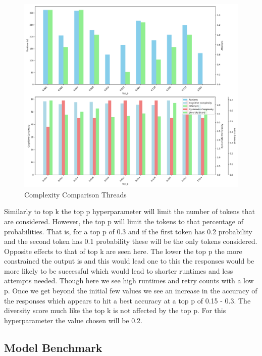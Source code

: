 \documentclass[12pt]{extarticle}
\begin{document}
\begin{figure}[h!]
\centering
\includegraphics[width=0.8\linewidth]{Images/Hyperparam_top_p_Comparison.png}
\caption{Complexity Comparison Threads}
\label{fig:Complexity_Comparison_Threads}
\end{figure}

Similarly to top k the top p hyperparameter will limit the number of tokens that are considered. However, the top p will limit the tokens to that percentage of probabilities. That is, for a top p of 0.3 and if the first token has 0.2 probability and the second token has 0.1 probability these will be the only tokens considered. Opposite effects to that of top k are seen here. The lower the top p the more constrained the output is and this would lead one to this the responses would be more likely to be successful which would lead to shorter runtimes and less attempts needed. Though here we see high runtimes and retry counts with a low p. Once we get beyond the initial few values we see an increase in the accuracy of the responses which appears to hit a best accuracy at a top p of 0.15 - 0.3. The diversity score much like the top k is not affected by the top p. For this hyperparameter the value chosen will be 0.2.


\subsection{Model Benchmark}
\end{document}
